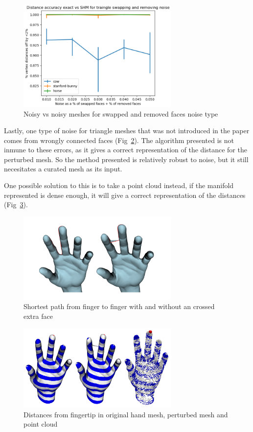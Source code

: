 \documentclass[sigconf]{acmart}
\begin{document}
\begin{figure}
  \centering
  \includegraphics[width=8cm]{original_vs_original_swapped_and_removed_triangles.png}
  \caption{Noisy vs noisy meshes for swapped and removed faces noise type}
  \label{fig:noisy_vs_noisy_swapped_and_removed}
\end{figure}

Lastly, one type of noise for triangle meshes that was not introduced in the paper comes from
wrongly connected faces (Fig~\ref{fig:hands}). The algorithm presented is not inmune to these errors,
as it gives a correct representation of the distance for the perturbed mesh. So the method
presented is relatively robust to noise, but it still necesitates a curated mesh as its input. 

One possible solution to this is to take a point cloud instead, if the manifold represented is
dense enough, it will give a correct representation of the distances (Fig~\ref{fig:hand_distances}).

\begin{figure}
  \centering
  \includegraphics[width=8cm]{hands.png}
  \caption{Shortest path from finger to finger with and without an crossed extra face}
  \label{fig:hands}
\end{figure}

\begin{figure}
  \centering
  \includegraphics[width=8cm]{hands_distances.png}
  \caption{Distances from fingertip in original hand mesh, perturbed mesh and point cloud}
  \label{fig:hand_distances}
\end{figure}
\end{document}
